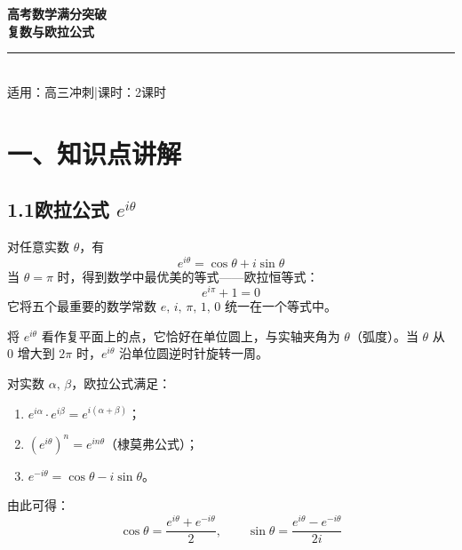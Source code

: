 \documentclass[12pt, a4paper]{ctexart}
\begin{document}
\begin{center}
{\Huge\bfseries\textcolor{mainblue}{高考数学满分突破}}\\[6pt]
{\LARGE\bfseries\textcolor{mainblue}{复数与欧拉公式}}\\[12pt]
\rule{0.6\textwidth}{1pt}\\[8pt]
{\normalsize 适用：高三冲刺\quad |\quad 课时：2课时}
\end{center}
\vspace{10pt}

\section*{\textcolor{mainblue}{一、知识点讲解}}

\subsection*{1.1\quad 欧拉公式 $e^{i\theta}$}

\begin{knowledgebox}[欧拉公式]
对任意实数 $\theta$，有
\[
  \boxed{e^{i\theta} = \cos\theta + i\sin\theta}
\]
当 $\theta = \pi$ 时，得到数学中最优美的等式——欧拉恒等式：
\[
  e^{i\pi} + 1 = 0
\]
它将五个最重要的数学常数 $e,\,i,\,\pi,\,1,\,0$ 统一在一个等式中。
\end{knowledgebox}

\begin{tipbox}[几何直观]
将 $e^{i\theta}$ 看作复平面上的点，它恰好在单位圆上，与实轴夹角为 $\theta$（弧度）。当 $\theta$ 从 $0$ 增大到 $2\pi$ 时，$e^{i\theta}$ 沿单位圆逆时针旋转一周。
\begin{center}
\end{center}
\end{tipbox}

\begin{knowledgebox}[指数运算法则]
对实数 $\alpha,\,\beta$，欧拉公式满足：
\begin{enumerate}[label=(\arabic*)]
  \item $e^{i\alpha}\cdot e^{i\beta} = e^{i(\alpha+\beta)}$；
  \item $\left(e^{i\theta}\right)^n = e^{in\theta}$（棣莫弗公式）；
  \item $e^{-i\theta} = \cos\theta - i\sin\theta$。
\end{enumerate}
由此可得：
\[
  \cos\theta = \frac{e^{i\theta}+e^{-i\theta}}{2}, \qquad
  \sin\theta = \frac{e^{i\theta}-e^{-i\theta}}{2i}
\]
\end{knowledgebox}
\end{document}
